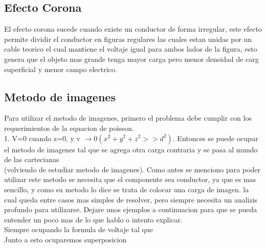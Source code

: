 \subsection{Efecto Corona}
El efecto corona sucede cuando existe un conductor de forma irregular, este efecto permite dividir el conductor en figuras regulares las cuales estan unidas por un cable teorico el cual mantiene el voltaje igual para ambos lados de la figura, esto genera que el objeto mas grande tenga mayor carga pero menor densidad de carg superficial y menor campo electrico.
\newpage
\subsection{Metodo de imagenes}
Para utilizar el metodo de imagenes, primero el problema debe cumplir con los requerimientos de la equacion de poisson.\\
1. V=0 cuando z=0, y v $\to 0 (x^2+y^2+z^2>>d^2)$.
Entonces se puede ocupar el metodo de imagenes tal que se agrega otra carga contraria y se pasa al mundo de las cartecianas\\
(volviendo de estudiar metodo de imagenes). Como antes se menciono para poder utilizar este metodo se necesita que el componente sea conductor, ya que es mas sencillo, y como su metodo lo dice se trata de colocar una carga de imagen. la cual queda entre casos mas simples de resolver, pero siempre necesita un analizis profundo para utilizarse. Dejare unos ejemplos a continuacion para que se pueda entender un poco mas de lo que hablo o intento explicar.\\
Siempre ocupando la formula de voltaje tal que
\\
Junto a esto ocuparemos superposicion





